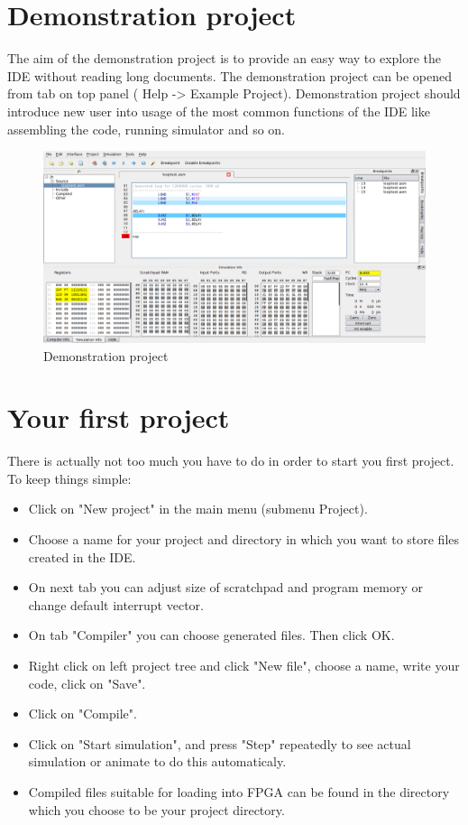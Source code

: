 
\section{Demonstration project}
    The aim of the demonstration project is to provide an easy way to explore the IDE without reading long documents.
    The demonstration project can be opened from tab on top panel ( Help -> Example Project).
    Demonstration project should introduce new user into usage of the most common functions of the IDE like assembling the code,
    running simulator and so on.
    \begin{figure}[h]
        \centering{}
        \includegraphics[width=\textwidth]{img/NewImg/demonstration_1.png}
        \caption{Demonstration project}
    \end{figure}

\section{Your first project}
    There is actually not too much you have to do in order to start you first project. To keep things simple:
    \begin{itemize}
        \item Click on "New project" in the main menu (submenu Project).
        \item Choose a name for your project and directory in which you want to store files created in the IDE.
        \item On next tab you can adjust size of scratchpad and program memory or change default interrupt vector.
        \item On tab "Compiler" you can choose generated files. Then click OK.
        \item Right click on left project tree and click "New file", choose a name, write your code, click on "Save".
        \item Click on "Compile".
        \item Click on "Start simulation", and press "Step" repeatedly to see actual simulation or animate to do this automaticaly.
        \item Compiled files suitable for loading into FPGA can be found in the directory which you choose to be your project directory.
    \end{itemize}

